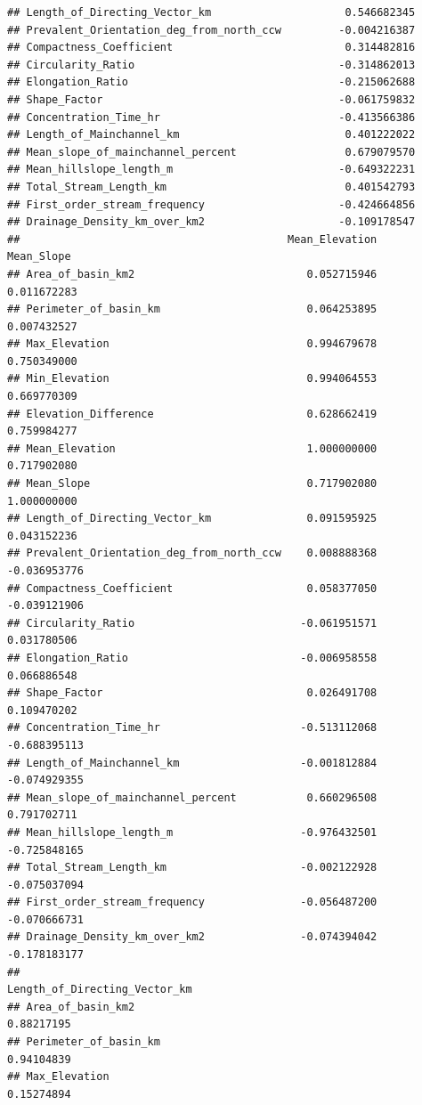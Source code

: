 \documentclass[11pt,]{article}
\begin{document}
\begin{verbatim}
## Length_of_Directing_Vector_km                     0.546682345
## Prevalent_Orientation_deg_from_north_ccw         -0.004216387
## Compactness_Coefficient                           0.314482816
## Circularity_Ratio                                -0.314862013
## Elongation_Ratio                                 -0.215062688
## Shape_Factor                                     -0.061759832
## Concentration_Time_hr                            -0.413566386
## Length_of_Mainchannel_km                          0.401222022
## Mean_slope_of_mainchannel_percent                 0.679079570
## Mean_hillslope_length_m                          -0.649322231
## Total_Stream_Length_km                            0.401542793
## First_order_stream_frequency                     -0.424664856
## Drainage_Density_km_over_km2                     -0.109178547
##                                          Mean_Elevation   Mean_Slope
## Area_of_basin_km2                           0.052715946  0.011672283
## Perimeter_of_basin_km                       0.064253895  0.007432527
## Max_Elevation                               0.994679678  0.750349000
## Min_Elevation                               0.994064553  0.669770309
## Elevation_Difference                        0.628662419  0.759984277
## Mean_Elevation                              1.000000000  0.717902080
## Mean_Slope                                  0.717902080  1.000000000
## Length_of_Directing_Vector_km               0.091595925  0.043152236
## Prevalent_Orientation_deg_from_north_ccw    0.008888368 -0.036953776
## Compactness_Coefficient                     0.058377050 -0.039121906
## Circularity_Ratio                          -0.061951571  0.031780506
## Elongation_Ratio                           -0.006958558  0.066886548
## Shape_Factor                                0.026491708  0.109470202
## Concentration_Time_hr                      -0.513112068 -0.688395113
## Length_of_Mainchannel_km                   -0.001812884 -0.074929355
## Mean_slope_of_mainchannel_percent           0.660296508  0.791702711
## Mean_hillslope_length_m                    -0.976432501 -0.725848165
## Total_Stream_Length_km                     -0.002122928 -0.075037094
## First_order_stream_frequency               -0.056487200 -0.070666731
## Drainage_Density_km_over_km2               -0.074394042 -0.178183177
##                                          Length_of_Directing_Vector_km
## Area_of_basin_km2                                           0.88217195
## Perimeter_of_basin_km                                       0.94104839
## Max_Elevation                                               0.15274894

\end{verbatim}
\end{document}
